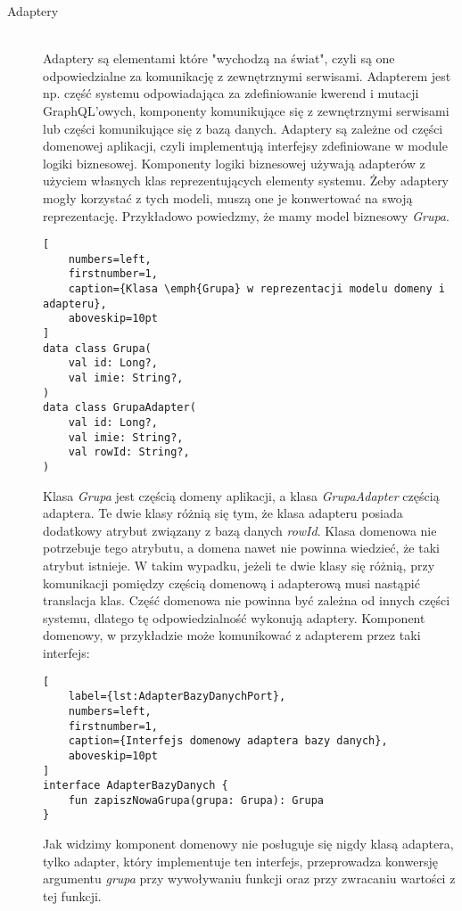 \begin{description}
\item[Adaptery] \hfill \\ Adaptery są elementami które "wychodzą na świat", czyli są one odpowiedzialne za komunikację z zewnętrznymi serwisami. Adapterem jest np. część systemu odpowiadająca za zdefiniowanie kwerend i mutacji GraphQL'owych, komponenty komunikujące się z zewnętrznymi serwisami lub części komunikujące się z bazą danych. Adaptery są zależne od części domenowej aplikacji, czyli implementują interfejsy zdefiniowane w module logiki biznesowej. Komponenty logiki biznesowej używają adapterów z użyciem własnych klas reprezentujących elementy systemu. Żeby adaptery mogły korzystać z tych modeli, muszą one je konwertować na swoją reprezentację. Przykładowo powiedzmy, że mamy model biznesowy \emph{Grupa}.

\begin{addmargin}[6mm]{0mm}
\begin{lstlisting}[
    numbers=left,
    firstnumber=1,
    caption={Klasa \emph{Grupa} w reprezentacji modelu domeny i adapteru},
    aboveskip=10pt
]
data class Grupa(
    val id: Long?,
    val imie: String?,
)
data class GrupaAdapter(
    val id: Long?,
    val imie: String?,
    val rowId: String?,
)
\end{lstlisting}
\end{addmargin}

Klasa \emph{Grupa} jest częścią domeny aplikacji, a klasa \emph{GrupaAdapter} częścią adaptera. Te dwie klasy różnią się tym, że klasa adapteru posiada dodatkowy atrybut związany z bazą danych \emph{rowId}. Klasa domenowa nie potrzebuje tego atrybutu, a domena nawet nie powinna wiedzieć, że taki atrybut istnieje. W takim wypadku, jeżeli te dwie klasy się różnią, przy komunikacji pomiędzy częścią domenową i adapterową musi nastąpić translacja klas. Część domenowa nie powinna być zależna od innych części systemu, dlatego tę odpowiedzialność wykonują adaptery. Komponent domenowy, w przykładzie może komunikować z adapterem przez taki interfejs:
\begin{addmargin}[6mm]{0mm}
\begin{lstlisting}[
    label={lst:AdapterBazyDanychPort},
    numbers=left,
    firstnumber=1,
    caption={Interfejs domenowy adaptera bazy danych},
    aboveskip=10pt
]
interface AdapterBazyDanych {
    fun zapiszNowaGrupa(grupa: Grupa): Grupa
}
\end{lstlisting}
\end{addmargin}
Jak widzimy komponent domenowy nie posługuje się nigdy klasą adaptera, tylko adapter, który implementuje ten interfejs, przeprowadza konwersję argumentu \emph{grupa} przy wywoływaniu funkcji oraz przy zwracaniu wartości z tej funkcji.


\end{description}
